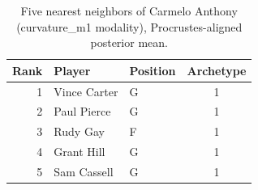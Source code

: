 \begin{table}[htbp]
  \centering\small
  \begin{tabular}{rllc}
    \toprule
    Rank & Player & Position & Archetype \\
    \midrule
    1 & Vince Carter & G & 1 \\
    2 & Paul Pierce & G & 1 \\
    3 & Rudy Gay & F & 1 \\
    4 & Grant Hill & G & 1 \\
    5 & Sam Cassell & G & 1 \\
    \bottomrule
  \end{tabular}
  \caption{Five nearest neighbors of Carmelo Anthony (curvature_m1 modality), Procrustes-aligned posterior mean.}
  \label{tab:Carmelo_Anthony_neighbors_curvature_m1}
\end{table}

